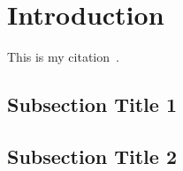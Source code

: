 \section{Introduction}\label{sec:introduction} 
This is my citation~\cite{Wright2009}. 

\subsection{Subsection Title 1}\label{subsec:1}

\subsection{Subsection Title 2}\label{subsec:2} 








